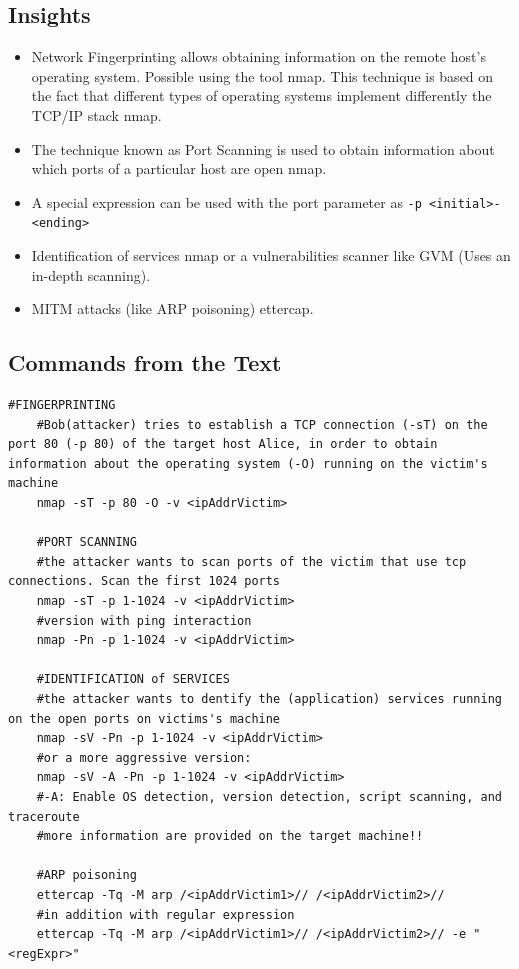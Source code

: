 \subsection*{Insights}
\begin{itemize}
	\item Network Fingerprinting allows obtaining information on the remote host’s operating system. Possible using the tool nmap. This technique is based on the fact that different types of operating systems implement differently the TCP/IP stack \textrightarrow nmap.
	\item The technique known as Port Scanning is used to obtain information about which ports of a particular host are open \textrightarrow nmap.
    \item A special expression can be used with the port parameter as \texttt{-p <initial>-<ending>}
    \item Identification of services \textrightarrow nmap or a vulnerabilities scanner like GVM (Uses an in-depth scanning).
    \item MITM attacks (like ARP poisoning) \textrightarrow ettercap.
\end{itemize}

\subsection*{Commands from the Text}

\begin{lstlisting}[style=bashStyle]
    #FINGERPRINTING
    #Bob(attacker) tries to establish a TCP connection (-sT) on the port 80 (-p 80) of the target host Alice, in order to obtain information about the operating system (-O) running on the victim's machine
    nmap -sT -p 80 -O -v <ipAddrVictim>

    #PORT SCANNING
    #the attacker wants to scan ports of the victim that use tcp connections. Scan the first 1024 ports
    nmap -sT -p 1-1024 -v <ipAddrVictim>
    #version with ping interaction
    nmap -Pn -p 1-1024 -v <ipAddrVictim>

    #IDENTIFICATION of SERVICES
    #the attacker wants to dentify the (application) services running on the open ports on victims's machine
    nmap -sV -Pn -p 1-1024 -v <ipAddrVictim>
    #or a more aggressive version:
    nmap -sV -A -Pn -p 1-1024 -v <ipAddrVictim>
    #-A: Enable OS detection, version detection, script scanning, and traceroute
    #more information are provided on the target machine!!

    #ARP poisoning
    ettercap -Tq -M arp /<ipAddrVictim1>// /<ipAddrVictim2>//
    #in addition with regular expression
    ettercap -Tq -M arp /<ipAddrVictim1>// /<ipAddrVictim2>// -e "<regExpr>"

\end{lstlisting}

